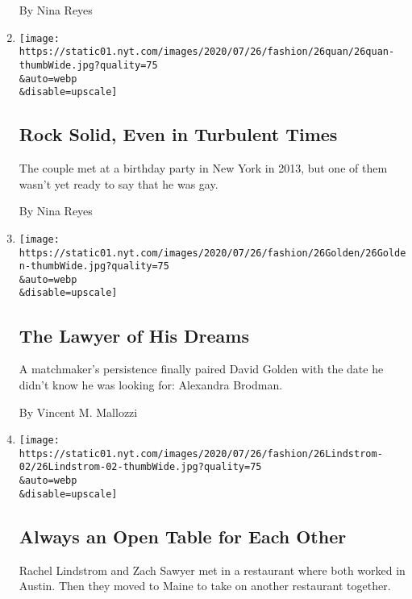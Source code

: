 \begin{enumerate}
  By Nina Reyes
\item
  \href{/2020/07/24/fashion/weddings/rock-solid-even-in-turbulent-times.html}{}

  \texttt{[image: https://static01.nyt.com/images/2020/07/26/fashion/26quan/26quan-thumbWide.jpg?quality=75\\\&auto=webp\\\&disable=upscale]}

  \hypertarget{rock-solid-even-in-turbulent-times}{%
  \subsection{Rock Solid, Even in Turbulent
  Times}\label{rock-solid-even-in-turbulent-times}}

  The couple met at a birthday party in New York in 2013, but one of
  them wasn't yet ready to say that he was gay.

  By Nina Reyes
\item
  \href{/2020/07/24/fashion/weddings/the-lawyer-of-his-dreams.html}{}

  \texttt{[image: https://static01.nyt.com/images/2020/07/26/fashion/26Golden/26Golden-thumbWide.jpg?quality=75\\\&auto=webp\\\&disable=upscale]}

  \hypertarget{the-lawyer-of-his-dreams}{%
  \subsection{The Lawyer of His Dreams}\label{the-lawyer-of-his-dreams}}

  A matchmaker's persistence finally paired David Golden with the date
  he didn't know he was looking for: Alexandra Brodman.

  By Vincent M. Mallozzi
\item
  \href{/2020/07/24/fashion/weddings/always-an-open-table-for-each-other.html}{}

  \texttt{[image: https://static01.nyt.com/images/2020/07/26/fashion/26Lindstrom-02/26Lindstrom-02-thumbWide.jpg?quality=75\\\&auto=webp\\\&disable=upscale]}

  \hypertarget{always-an-open-table-for-each-other}{%
  \subsection{Always an Open Table for Each
  Other}\label{always-an-open-table-for-each-other}}

  Rachel Lindstrom and Zach Sawyer met in a restaurant where both worked
  in Austin. Then they moved to Maine to take on another restaurant
  together.


\end{enumerate}
